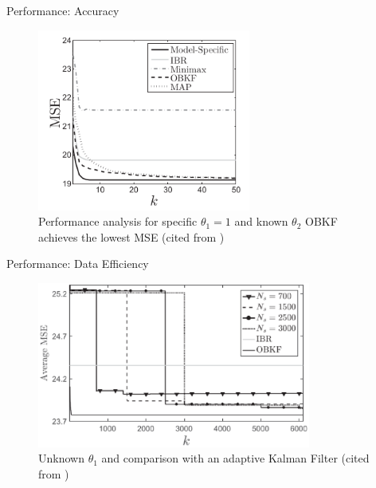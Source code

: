 \begin{frame}{Performance: Accuracy}
\begin{figure}[H]
    \begin{center}
    \includegraphics[width=7cm]{img/OBKF_r1.png}
    \caption{Performance analysis for specific $\theta_1 = 1$ and known $\theta_2$  \protect\linebreak OBKF achieves the lowest MSE (cited from \cite{Dehghannasiri2018})}
    \label{fig:r_1}
    \end{center}
\end{figure}
\end{frame}

\begin{frame}{Performance: Data Efficiency}
\begin{figure}[H]
    \begin{center}
    \includegraphics[width=9cm]{img/cmp_adaptive.eps}
    \caption{Unknown $\theta_1$ and comparison with an adaptive Kalman Filter (cited from \cite{Dehghannasiri2018})}
    \label{fig:cmp_adaptive}
    \end{center}
\end{figure}

\end{frame}


